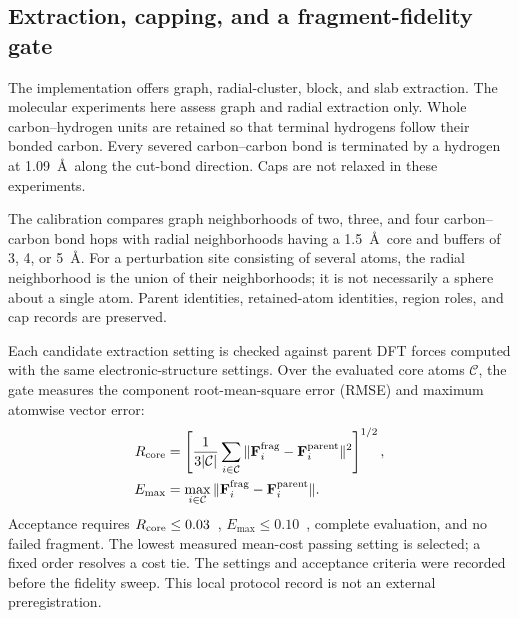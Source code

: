 \subsection{Extraction, capping, and a fragment-fidelity gate}
The implementation offers graph, radial-cluster, block, and slab extraction.
The molecular experiments here assess graph and radial extraction only.
Whole carbon--hydrogen units are retained so that terminal hydrogens
follow their bonded carbon. Every severed carbon--carbon bond is
terminated by a hydrogen at 1.09~\AA\ along the cut-bond direction.
Caps are not relaxed in these experiments.

The calibration compares graph neighborhoods of two, three, and four
carbon--carbon bond hops with radial neighborhoods having a
1.5~\AA\ core and buffers of 3, 4, or 5~\AA.
For a perturbation site consisting of several atoms, the radial
neighborhood is the union of their neighborhoods; it is not necessarily
a sphere about a single atom. Parent identities, retained-atom identities,
region roles, and cap records are preserved.

Each candidate extraction setting is checked against parent DFT forces
computed with the same electronic-structure settings. Over the evaluated
core atoms $\mathcal{C}$, the gate measures the component root-mean-square
error (RMSE) and maximum atomwise vector error:
\begin{align}
 R_{\rm core}&=
 \left[\frac{1}{3|\mathcal{C}|}
 \sum_{i\in\mathcal{C}}\|\mathbf{F}^{\rm frag}_i-
                         \mathbf{F}^{\rm parent}_i\|^2\right]^{1/2},\\
 E_{\max}&=\max_{i\in\mathcal{C}}
 \|\mathbf{F}^{\rm frag}_i-\mathbf{F}^{\rm parent}_i\|.
 \label{eq:fidelity}
\end{align}
Acceptance requires $R_{\rm core}\leq0.03$~\forceunit,
$E_{\max}\leq0.10$~\forceunit, complete evaluation, and no failed
fragment. The lowest measured mean-cost passing setting is selected;
a fixed order resolves a cost tie. The settings and acceptance criteria
were recorded before the fidelity sweep. This local protocol record
is not an external preregistration.

